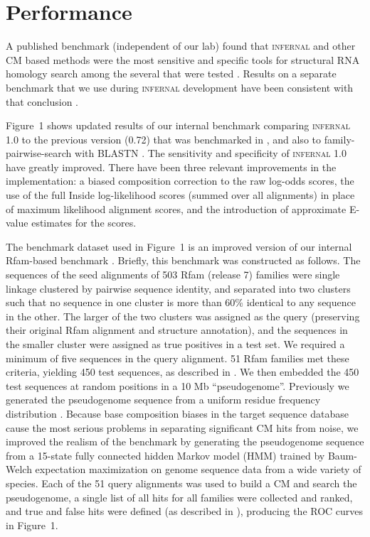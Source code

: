 
\section{Performance}

A published benchmark (independent of our lab) found that
\textsc{infernal} and other CM based methods were the most sensitive
and specific tools for structural RNA homology search among the
several that were tested \citep{Freyhult07}.  Results on a separate
benchmark that we use during \textsc{infernal} development have been
consistent with that conclusion \citep{NawrockiEddy07}.

Figure~1 shows updated results of our internal benchmark comparing
\textsc{infernal} 1.0 to the previous version (0.72) that was
benchmarked in \citep{Freyhult07}, and also to family-pairwise-search
with BLASTN \citep{Altschul97,Grundy98b}.  The sensitivity and
specificity of \textsc{infernal} 1.0 have greatly improved. There have
been three relevant improvements in the implementation: a biased
composition correction to the raw log-odds scores, the use of the full
Inside log-likelihood scores (summed over all alignments) in place of
maximum likelihood alignment scores, and the introduction of
approximate E-value estimates for the scores.

The benchmark dataset used in Figure~1 is an improved version of our
internal Rfam-based benchmark \citep{NawrockiEddy07}. Briefly, this
benchmark was constructed as follows. The sequences of the seed
alignments of 503 Rfam (release 7) families were single linkage
clustered by pairwise sequence identity, and separated into two
clusters such that no sequence in one cluster is more than 60\%
identical to any sequence in the other. The larger of the two clusters
was assigned as the query (preserving their original Rfam alignment
and structure annotation), and the sequences in the smaller cluster
were assigned as true positives in a test set. We required a minimum
of five sequences in the query alignment. 51 Rfam families met these
criteria, yielding 450 test sequences, as described in
\citep{NawrockiEddy07}. We then embedded the 450 test sequences at
random positions in a 10 Mb ``pseudogenome''. Previously we generated
the pseudogenome sequence from a uniform residue frequency
distribution \citep{NawrockiEddy07}. Because base composition biases
in the target sequence database cause the most serious problems in
separating significant CM hits from noise, we improved the realism of
the benchmark by generating the pseudogenome sequence from a 15-state
fully connected hidden Markov model (HMM) trained by Baum-Welch
expectation maximization \citep{Durbin98} on genome sequence data from
a wide variety of species. Each of the 51 query alignments was used to
build a CM and search the pseudogenome, a single list of all hits for
all families were collected and ranked, and true and false hits were
defined (as described in \citep{NawrockiEddy07}), producing the ROC
curves in Figure~1.

